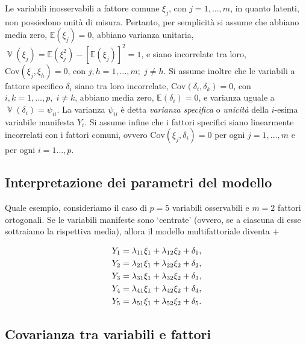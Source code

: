 \documentclass[
  11pt,
]{krantz}
\DeclareMathOperator{\V}{\mathbb{V}} %
\newcommand{\E}{\mathbb{E}} %
\theoremstyle{definition}
\theoremstyle{definition}
\theoremstyle{definition}
\theoremstyle{definition}
\theoremstyle{remark}
\begin{document}
Le variabili inosservabili a fattore comune \(\xi_j\), con \(j=1, \dots, m\), in quanto latenti, non possiedono unità di misura. Pertanto, per semplicità si assume che abbiano media zero, \(\E (\xi_j)=0\), abbiano varianza unitaria, \(\V (\xi_j)= \E (\xi_j^2) - [\E (\xi_j)]^2=1\), e siano incorrelate tra loro, \(\mbox{Cov}(\xi_j, \xi_h)=0\), con \(j, h = 1, \dots, m; \;j \neq h\). Si assume inoltre che le variabili a fattore specifico \(\delta_i\) siano tra loro incorrelate, \(\mbox{Cov}(\delta_i,\delta_k)=0\), con \(i, k = 1, \dots, p, \; i \neq k\), abbiano media zero, \(\E (\delta_i)=0\), e varianza uguale a \(\V (\delta_i) = \psi_{ii}\). La varianza \(\psi_{ii}\) è detta \emph{varianza specifica} o \emph{unicità} della \(i\)-esima variabile manifesta \(Y_i\). Si assume infine che i fattori specifici siano linearmente incorrelati con i fattori comuni, ovvero \(\mbox{Cov}(\xi_j, \delta_i)=0\) per ogni \(j=1, \dots, m\) e per ogni \(i=1\dots,p\).

\hypertarget{interpretazione-dei-parametri-del-modello}{%
\subsection{Interpretazione dei parametri del modello}\label{interpretazione-dei-parametri-del-modello}}

Quale esempio, consideriamo il caso di \(p=5\) variabili osservabili e \(m=2\) fattori ortogonali. Se le variabili manifeste sono `centrate' (ovvero, se a ciascuna di esse sottraiamo la rispettiva media), allora il modello multifattoriale diventa +

\begin{equation}
\begin{aligned}
  Y_1 &= \lambda_{11} \xi_1 + \lambda_{12} \xi_2 + \delta_1,\notag\\
  Y_2 &= \lambda_{21} \xi_1 + \lambda_{22} \xi_2 + \delta_2,\notag\\
  Y_3 &= \lambda_{31} \xi_1 + \lambda_{32} \xi_2 + \delta_3,\notag\\
  Y_4 &= \lambda_{41} \xi_1 + \lambda_{42} \xi_2 + \delta_4,\notag\\
  Y_5 &= \lambda_{51} \xi_1 + \lambda_{52} \xi_2 + \delta_5.\notag
\label{eq:plurifattore2}
\end{aligned}
\end{equation}

\hypertarget{covarianza-tra-variabili-e-fattori}{%
\subsection{Covarianza tra variabili e fattori}\label{covarianza-tra-variabili-e-fattori}}
\end{document}
